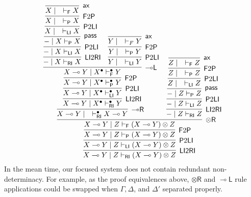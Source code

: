 \documentclass[submission,copyright,creativecommons]{eptcs}
\theoremstyle{definition}
\newcommand{\tr}{\otimes \mathsf{R}}
\newcommand{\lright}{{\multimap}\mathsf{R}}
\newcommand{\lleft}{{\multimap}\mathsf{L}}
\newcommand{\pass}{\mathsf{pass}}
\newcommand{\ax}{\mathsf{ax}}
\newcommand{\lolli}{\multimap}
\newcommand{\RI}{\mathsf{RI}}
\newcommand{\LI}{\mathsf{LI}}
\newcommand{\Pass}{\mathsf{P}}
\newcommand{\F}{\mathsf{F}}
\begin{document}
\begin{displaymath}
  \infer[\mathsf{\LI 2 \RI}]{X \multimap Y \mid Z \vdash_{\mathsf{RI}} (X\multimap Y) \otimes Z}{
    \infer[\Pass 2 \LI]{X \multimap Y \mid Z \vdash_{\mathsf{LI}} (X\multimap Y) \otimes Z}{
      \infer[\F 2 \Pass]{X \multimap Y \mid Z \vdash_{\Pass} (X\multimap Y) \otimes Z}{
        \infer[\tr]{X \multimap Y \mid Z \vdash_{\F} (X\multimap Y) \otimes Z}{
          \infer[\lright]{X \lolli Y \mid \quad \vdash^{\bullet}_{\RI} X \lolli Y}{
            \infer[\LI 2 \RI]{X \lolli Y \mid X^{\bullet} \vdash^{\bullet}_{\RI} Y}{
              \infer[\Pass 2 \LI]{X \lolli Y \mid X^{\bullet} \vdash^{\bullet}_{\LI} Y}{
                \infer[\F 2 \Pass]{X \lolli Y \mid X^{\bullet} \vdash^{\bullet}_{\Pass} Y}{
                  \infer[\lleft]{X \lolli Y \mid X^{\bullet} \vdash^{\bullet}_{\F} Y}{
                    \infer[\LI 2 \RI]{- \mid X \vdash_{\RI} X}{
                      \infer[\Pass 2 \LI]{- \mid X \vdash_{\LI} X}{
                        \infer[\pass]{- \mid X \vdash_{\Pass} X}{
                          \infer[\Pass 2 \LI]{X \mid \quad \vdash_{\LI} X}{
                            \infer[\F 2 \Pass]{X \mid \quad \vdash_{\Pass} X}{
                              \infer[\ax]{X \mid \quad \vdash_{\F} X}{}
                            }
                          }
                        }
                      }
                    }
                    &
                    \infer[\Pass 2 \LI]{Y \mid \quad \vdash_{\LI} Y}{
                    \infer[\F 2 \Pass]{Y \mid \quad \vdash_{\Pass} Y}{
                    \infer[\ax]{Y \mid \quad \vdash_{F} Y}{}
                    }
                      }
                    }
                  }
                }
              }
            }
            &
                \infer[\LI 2 \RI]{- \mid Z \vdash_{\RI} Z}{
                  \infer[\Pass 2 \LI]{- \mid Z \vdash_{\LI} Z}{
                    \infer[\pass]{- \mid Z \vdash_{\Pass} Z}{
                      \infer[\Pass 2 \LI]{Z \mid \quad \vdash_{\LI} Z}{
                        \infer[\F 2 \Pass]{Z \mid \quad \vdash_{\Pass} Z}{
                          \infer[\ax]{Z \mid \quad \vdash_{\F} Z}{}
                        }
                      }
                    }
                  }
                }
          }
              }
            }
          }
\end{displaymath}
In the mean time, our focused system does not contain redundant non-determinacy.
For example, as the proof equivalences above, $\tr$ and $\lleft$ rule applications could be swapped when $\Gamma, \Delta$, and $\Delta'$ separated properly.
\end{document}
